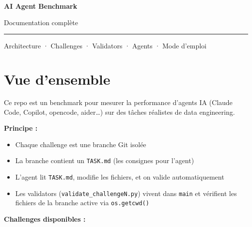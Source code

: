 \documentclass[11pt,a4paper]{article}
\newcommand{\code}[1]{\texttt{#1}}
\begin{document}

\begin{titlepage}
  \centering
  \vspace*{3cm}
  {\Huge\bfseries AI Agent Benchmark\par}
  \vspace{0.5cm}
  {\Large Documentation complète\par}
  \vspace{2cm}
  \rule{0.6\textwidth}{0.5pt}\par
  \vspace{1cm}
  {\normalsize
    Architecture · Challenges · Validators · Agents · Mode d'emploi
  \par}
  \vfill
\end{titlepage}

\tableofcontents
\newpage

\section{Vue d'ensemble}

Ce repo est un benchmark pour mesurer la performance d'agents IA (Claude Code,
Copilot, opencode, aider\ldots) sur des tâches réalistes de data engineering.

\textbf{Principe :}
\begin{itemize}
  \item Chaque challenge est une branche Git isolée
  \item La branche contient un \code{TASK.md} (les consignes pour l'agent)
  \item L'agent lit \code{TASK.md}, modifie les fichiers, et on valide automatiquement
  \item Les validators (\code{validate\_challengeN.py}) vivent dans \code{main}
        et vérifient les fichiers de la branche active via \code{os.getcwd()}
\end{itemize}

\textbf{Challenges disponibles :}
\end{document}
